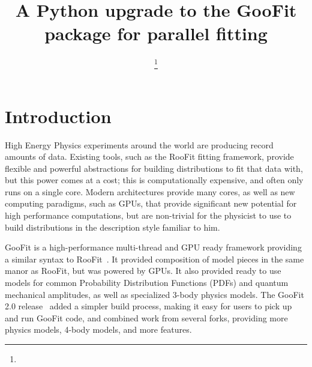 \documentclass{webofc}
\begin{document}
%
\title{A Python upgrade to the GooFit package for parallel fitting}

\author{
        \fnsep\thanks{}
        \and
        \and 
        \and
        \and 
        \and 
}        %


%
\maketitle
%
\section{Introduction}
\label{intro}
High Energy Physics experiments around the world are producing record amounts of data. Existing tools, such as the RooFit fitting framework, provide flexible and powerful abstractions for building distributions to fit that data with, but this power comes at a cost; this is computationally expensive, and often only runs on a single core. Modern architectures provide many cores, as well as new computing paradigms, such as GPUs, that provide significant new potential for high performance computations, but are non-trivial for the physicist to use to build distributions in the description style familiar to him.


GooFit is a high-performance multi-thread and GPU ready framework providing a similar syntax to RooFit~\cite{lib:RooFit,lib:GooFit:main}. It provided composition of model pieces in the same manor as RooFit, but was powered by GPUs. It also provided ready to use models for common Probability Distribution Functions (PDFs) and quantum mechanical amplitudes, as well as specialized 3-body physics models. The GooFit 2.0 release~\cite{lib:GooFit} added a simpler build process, making it easy for users to pick up and run GooFit code, and combined work from several forks, providing more physics models, 4-body models, and more features.
\end{document}
